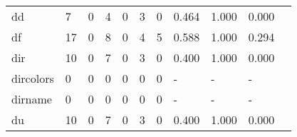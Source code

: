 \begin{longtable}{lp{1.2cm}p{1.2cm}p{1.2cm}p{1.2cm}p{1.2cm}p{1.2cm}p{1.2cm}p{1.2cm}p{1.2cm}p{1.2cm}}
dd        &                                     7 &                                                  0 &                                                4 &                                               0 &                                                3 &                                              0 &                                         0.464 &                                              1.000 &                                              0.000 \\
df        &                                    17 &                                                  0 &                                                8 &                                               0 &                                                4 &                                              5 &                                         0.588 &                                              1.000 &                                              0.294 \\
dir       &                                    10 &                                                  0 &                                                7 &                                               0 &                                                3 &                                              0 &                                         0.400 &                                              1.000 &                                              0.000 \\
dircolors &                                     0 &                                                  0 &                                                0 &                                               0 &                                                0 &                                              0 &                                             - &                                                  - &                                                  - \\
dirname   &                                     0 &                                                  0 &                                                0 &                                               0 &                                                0 &                                              0 &                                             - &                                                  - &                                                  - \\
du        &                                    10 &                                                  0 &                                                7 &                                               0 &                                                3 &                                              0 &                                         0.400 &                                              1.000 &                                              0.000 \\

\end{longtable}
